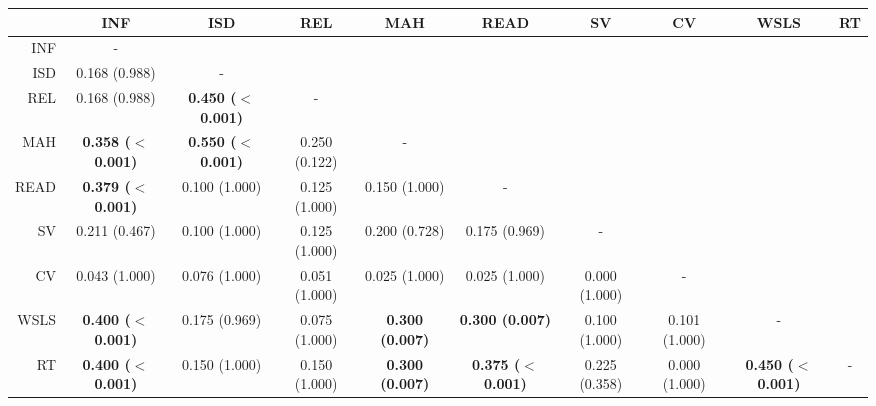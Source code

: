 \documentclass[a4paper,notitlepage,12pt]{article}
\begin{document}
\begin{table}[H]
    \centering
    \begin{adjustbox}{center}
    \tiny
    \begin{tabular}{rccccccccc}
        \toprule
        {} & INF &      ISD &      REL &     MAH &     READ &       SV &       CV &     WSLS & RT \\
        \midrule
        INF  &                          - &                            &                &                         &                            &                &                &                            &    \\
        ISD  &              0.168 (0.988) &                          - &                &                         &                            &                &                &                            &    \\
        REL  &              0.168 (0.988) &  \textbf{0.450 ($<$0.001)} &              - &                         &                            &                &                &                            &    \\
        MAH  &  \textbf{0.358 ($<$0.001)} &  \textbf{0.550 ($<$0.001)} &  0.250 (0.122) &                       - &                            &                &                &                            &    \\
        READ &  \textbf{0.379 ($<$0.001)} &              0.100 (1.000) &  0.125 (1.000) &           0.150 (1.000) &                          - &                &                &                            &    \\
        SV   &              0.211 (0.467) &              0.100 (1.000) &  0.125 (1.000) &           0.200 (0.728) &              0.175 (0.969) &              - &                &                            &    \\
        CV   &              0.043 (1.000) &              0.076 (1.000) &  0.051 (1.000) &           0.025 (1.000) &              0.025 (1.000) &  0.000 (1.000) &              - &                            &    \\
        WSLS &  \textbf{0.400 ($<$0.001)} &              0.175 (0.969) &  0.075 (1.000) &  \textbf{0.300 (0.007)} &     \textbf{0.300 (0.007)} &  0.100 (1.000) &  0.101 (1.000) &                          - &    \\
        RT   &  \textbf{0.400 ($<$0.001)} &              0.150 (1.000) &  0.150 (1.000) &  \textbf{0.300 (0.007)} &  \textbf{0.375 ($<$0.001)} &  0.225 (0.358) &  0.000 (1.000) &  \textbf{0.450 ($<$0.001)} &  - \\

\end{tabular}
\end{adjustbox}
\end{table}
\end{document}
